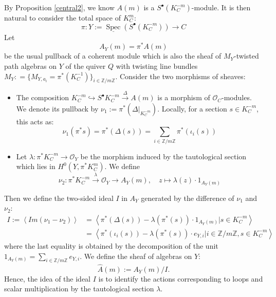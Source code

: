 \documentclass[11pt]{amsart}
\theoremstyle{plain}
\theoremstyle{definition}
\theoremstyle{remark}
\def\O{\mathcal{O}}
\def\zm{\mathbb{Z}/m\mathbb{Z}}
\def\wAm{\widehat{A}(m)}
\begin{document}
By Proposition \ref{central2}, we know $A(m)$ is a $S^\bullet(K_C^{-m})$-module. It is then natural to consider the total space of $K_C^m$:
\[\pi: Y :=\underline{\operatorname{Spec}}(S^\bullet (K_C^{-m}))\to C\]
Let 
\[A_Y(m)= \pi^*A(m)\]
be the usual pullback of a coherent module which is also the sheaf of $M_Y$-twisted path algebras on $Y$ of the quiver $Q$ with twisting line bundles $M_Y: = \{M_{Y,a_i}= \pi^* (K_C^{-1})\}_{i\in \zm}$. Consider the two morphisms of sheaves: 
\begin{itemize}
    \item The composition $K_C^{-m} \hookrightarrow S^\bullet K_C^{-m} \xrightarrow{\Delta} A(m)$ is a morphism of $\O_C$-modules. We denote its pullback by $\nu_1 := \pi^*(\Delta|_{K_{C}^{-m}})$. Locally, for a section $s\in K_C^{-m}$, this acts as: 
    \[ \nu_1(\pi^*s) =\pi^* \left(\Delta(s)\right) = \sum_{i\in \zm}\pi^*(\iota_i(s))\] 
    
    \item Let $\lambda: \pi^*K_C^{-m} \to \O_Y$ be the morphism induced by the tautological section which lies in $H^0(Y, \pi^*K_C^m)$. We define
    \[ \nu_2: \pi^* K_C^{-m}\xrightarrow{\lambda} \O_Y \to A_Y(m), \quad z \mapsto \lambda(z)\cdot  1_{A_Y(m)} \]
\end{itemize}
Then we define the two-sided ideal $I$ in $A_Y$ generated by the difference of $\nu_1$ and $\nu_2$:
\begin{align*}
    I:=\left\langle  Im(\nu_1-\nu_2 )\right\rangle  &=\left\langle \pi^*(\Delta (s) )- \lambda(\pi^*(s))\cdot 1_{A_Y(m)} |s\in K_C^{-m}\right\rangle\\
    &= \left\langle \pi^*(\iota_i(s)) - \lambda( \pi^*(s))\cdot e_{Y,i}|i\in \zm, s\in K_C^{-m}\right\rangle
\end{align*}
where the last equality is obtained by the decomposition of the unit $1_{A_Y(m)} = \sum_{i\in \zm}e_{Y,i}$.
We define the sheaf of algebras on $Y$: 
\[ \wAm := A_Y(m)/I.\]
Hence, the idea of the ideal $I$ is to identify the actions corresponding to loops and scalar multiplication by the tautological section $\lambda$. 
\end{document}
